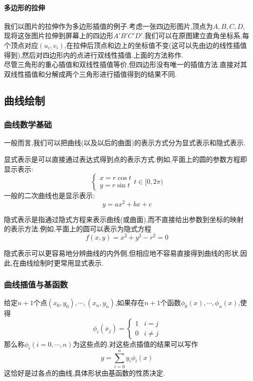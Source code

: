 \documentclass{ctexart}
\begin{document}
\paragraph{多边形的拉伸}
我们以图片的拉伸作为多边形插值的例子.考虑一张四边形图片,顶点为$A,B,C,D$,现将这张图片拉伸到屏幕上的四边形$A'B'C'D'$.我们可以在原图建立直角坐标系,每个顶点对应$\left(u_i,v_i\right)$,在拉伸后顶点和边上的坐标值不变(这可以先由边的线性插值得到),然后对四边形内的点进行双线性插值.上面的方法称作.\\
\indent 尽管三角形的重心插值和双线性插值等价,但四边形没有唯一的插值方法.直接对其双线性插值和分解成两个三角形进行插值得到的结果不同.
\subsection{曲线绘制}
\subsubsection{曲线数学基础}
一般而言,我们可以把曲线(以及以后的曲面)的表示方式分为显式表示和隐式表示.
\begin{definition}[显式表示]
    显式表示是可以直接通过表达式得到点的表示方式.例如,平面上的圆的参数方程即显示表示:
    \[\begin{cases}
        x=r\cos t\\
        y=r\sin t
    \end{cases}t\in[0,2\pi)\]
    一般的二次曲线也是显示表示:
    \[y=ax^2+bx+c\]
\end{definition}
\begin{definition}[隐式表示]
    隐式表示是指通过隐式方程来表示曲线(或曲面),而不直接给出参数到坐标的映射的表示方法.例如,平面上的圆可以表示为隐式方程
    \[f(x,y)=x^2+y^2-r^2=0\]
\end{definition}
隐式表示可以更容易地分辨曲线的内外侧,但相应地不容易直接得到曲线的形状.因此,在曲线绘制时更常用显式表示.
\subsubsection{曲线插值与基函数}
\begin{definition}[基函数]
    给定$n+1$个点$(x_0,y_0),\cdots,(x_n,y_n)$,如果存在$n+1$个函数$\phi_0(x),\cdots,\phi_n(x)$,使得
    \[\phi_i(x_j)=\begin{cases}
        1&i=j\\
        0&i\neq j
    \end{cases}\]
    那么称$\phi_i(i=0,\cdots,n)$为这些点的.对这些点插值的结果可以写作
    \[y=\sum_{i=0}^ny_i\phi_i(x)\]
    这恰好是过各点的曲线,具体形状由基函数的性质决定.
\end{definition}
\end{document}
